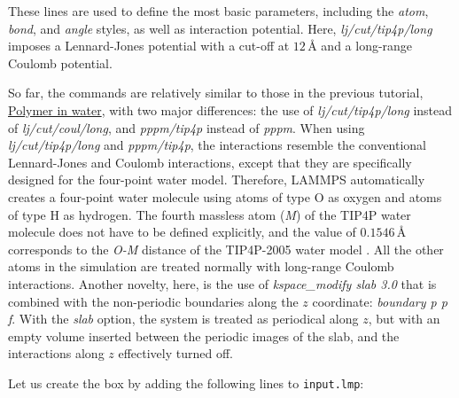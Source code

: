\documentclass[9pt,tutorial]{livecoms}
\newcommand{\flecmd}[1]{\textcolor{command}{\texttt{#1}}} %
\begin{document}
These lines are used to define the most basic parameters, including the
\textit{atom}, \textit{bond}, and \textit{angle} styles, as well as interaction
potential. Here, \textit{lj/cut/tip4p/long} imposes a Lennard-Jones potential with
a cut-off at $12\,\text{$\text{\AA{}}$}$ and a long-range Coulomb potential.

So far, the commands are relatively similar to those in the previous tutorial,
\hyperref[all-atoms-label]{Polymer in water}, with two major differences: the use
of \textit{lj/cut/tip4p/long} instead of \textit{lj/cut/coul/long}, and \textit{pppm/tip4p}
instead of \textit{pppm}. When using \textit{lj/cut/tip4p/long} and \textit{pppm/tip4p},
the interactions resemble the conventional Lennard-Jones and Coulomb interactions,
except that they are specifically designed for the four-point water model. Therefore,
LAMMPS automatically creates a four-point water molecule using atoms of type O as
oxygen and atoms of type H as hydrogen. The fourth massless atom (\textit{M}) of the
TIP4P water molecule does not have to be defined explicitly, and the value of
$0.1546\,\text{$\text{\AA{}}$}$ corresponds to the \textit{O-M} distance of the
TIP4P-2005 water model \cite{abascal2005general}. All the other atoms in the simulation
are treated normally with long-range Coulomb interactions. Another novelty, here, is
the use of \textit{kspace\_modify slab 3.0} that is combined with the non-periodic
boundaries along the $z$ coordinate: \textit{boundary p p f}. With the \textit{slab}
option, the system is treated as periodical along $z$, but with an empty volume inserted
between the periodic images of the slab, and the interactions along $z$ effectively turned off.

Let us create the box by adding the following lines to \flecmd{input.lmp}:
\end{document}

